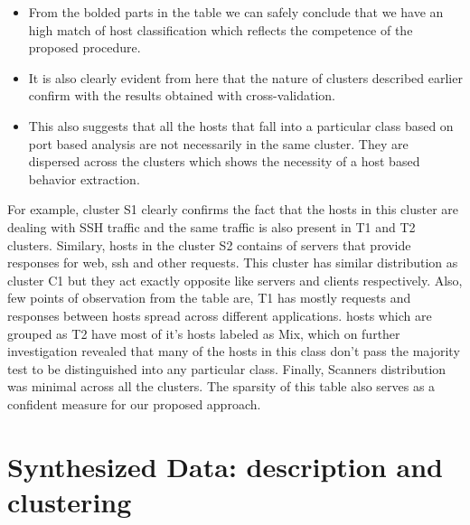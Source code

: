 \begin{itemize}
	\item From the bolded parts in the table we can safely conclude that we have an high match of host classification which reflects the competence of the proposed procedure.
	
	\item  It is also clearly evident from here that the nature of clusters described earlier confirm with the results obtained with cross-validation.
	
	\item This also suggests that all the hosts that fall into a particular class based on port based analysis are not necessarily in the same cluster. They are dispersed across the clusters which shows the necessity of a host based behavior extraction.	
\end{itemize}
  For example, cluster S1 clearly confirms the fact that the hosts in this cluster are dealing with SSH traffic and the same traffic is also present in T1 and T2 clusters. Similary, hosts in the cluster S2 contains of servers that provide responses for web, ssh and other requests. This cluster has similar distribution as cluster C1 but they act exactly opposite like servers and clients respectively. Also, few points of observation from the table are, T1 has mostly requests and responses between hosts spread across different applications. hosts which are grouped as T2 have most of it's hosts labeled as Mix, which on further investigation revealed that many of the hosts in this class don't pass the majority test to be distinguished into any particular class. Finally, Scanners distribution was minimal across all the clusters. The sparsity of this table also serves as a confident measure for our proposed approach.

\section{Synthesized Data: description and clustering}

